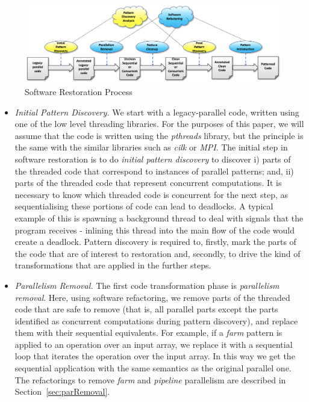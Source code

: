 \begin{figure}
\centering
\includegraphics[width=\textwidth]{images/SoftRest.png}
\caption{Software Restoration Process}
\label{fig:SoftRest}
\end{figure}

\begin{itemize}
\item \emph{Initial Pattern Discovery.} We start with a legacy-parallel code, written using one of the low level threading libraries. For the purposes of this paper, we will assume that the code is written using the \emph{pthreads} library, but the principle is the same with the similar libraries such as \emph{cilk} or \emph{MPI}. The initial step in software restoration is to do \emph{initial pattern discovery} to discover i) parts of the threaded code that correspond to instances of parallel patterns; and, ii) parts of the threaded code that represent concurrent computations. It is necessary to know which threaded code is concurrent for the next step, as sequentialising these portions of code can lead to deadlocks. A typical example of this is spawning a background thread to deal with signals that the program receives - inlining this thread into the main flow of the code would create a deadlock. Pattern discovery is required to, firstly, mark the parts of the code that are of interest to restoration and, secondly, to drive the kind of transformations that are applied in the further steps.

\item \emph{Parallelism Removal.} The first code transformation phase is \emph{parallelism removal}. Here, using software refactoring, we remove parts of the threaded code  that are safe to remove (that is, all parallel parts except the parts identified as concurrent computations during pattern discovery), and replace them with their sequential equivalents. For example, if a \emph{farm} pattern is applied to an operation over an input array, we replace it with a sequential loop that iterates the operation over the input array. In this way we get the sequential application with the same semantics as the original parallel one. The refactorings to remove \emph{farm} and \emph{pipeline} parallelism are described in Section~\ref{sec:parRemoval}.


\end{itemize}

